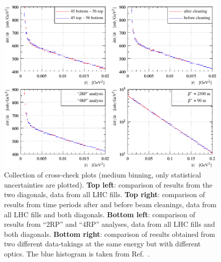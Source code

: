 \begin{figure}
\vskip-4mm
\begin{center}
\includegraphics{fig/t_dist_cross_checks.pdf}
\vskip-2mm
\caption{%
Collection of cross-check plots (medium binning, only statistical uncertainties are plotted).
{\bf Top left}: comparison of results from the two diagonals, data from all LHC fills.
{\bf Top right}: comparison of results from time periods after and before beam cleanings, data from all LHC fills and both diagonals.
{\bf Bottom left}: comparison of results from ``2RP'' and ``4RP'' analyses, data from all LHC fills and both diagonals.
{\bf Bottom right}: comparison of results obtained from two different data-takings at the same energy but with different optics. The blue histogram is taken from Ref.~\cite{totem-13tev-90m}.
}
\label{fig:dsdt checks}
\end{center}
\end{figure}



